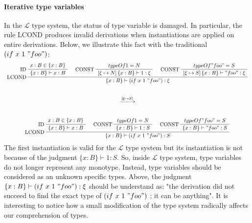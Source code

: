 \documentclass[a4paper]{report}
\newcommand{\lang}[0]{\mathcal{L}}
\newcommand{\ax}[1]%
{\AxiomC{$#1$}}
\newcommand{\unc}[1]%
{\UnaryInfC{$#1$}}
\newcommand{\tric}[1]%
{\TrinaryInfC{$#1$}}
\newcommand{\drule}%
{\DisplayProof}
\begin{document}
\paragraph{Iterative type variables} In the $\lang$ type system, the status of type variable is damaged. In particular, the rule LCOND produces invalid derivations when instantiations are applied on entire derivations. Below, we illustrate this fact with the traditional $(if\ x\ 1\ "foo")$:
$$\begin{array}{c}
\ax{x:B\in\{x:B\}}
\LeftLabel{ID}
\unc{\{x:B\}\vdash x:B}
\ax{typeOf{1}=N}
\LeftLabel{CONST}
\unc{\left[\xi\mapsto N\right]\{x:B\}\vdash 1:\xi}
\ax{typeOf{"foo"}=S}
\LeftLabel{CONST}
\unc{\left[\xi\mapsto S\right]\{x:B\}\vdash "foo":\xi}
\LeftLabel{LCOND}
\tric{\{x:B\}\vdash (if\ x\ 1\ "foo"):\xi}
\drule
\\\\\\
\xlongrightarrow{[\xi\mapsto S]}
\\\\\\
\ax{x:B\in\{x:B\}}
\LeftLabel{ID}
\unc{\{x:B\}\vdash x:B}
\ax{typeOf{1}=N}
\LeftLabel{CONST}
\unc{\{x:B\}\vdash 1:S}
\ax{typeOf{"foo"}=S}
\LeftLabel{CONST}
\unc{\{x:B\}\vdash "foo":S}
\LeftLabel{LCOND}
\tric{\{x:B\}\vdash (if\ x\ 1\ "foo"):S}
\drule
\end{array}$$
The first instantiation is valid for the $\lang$ type system but its instantiation is not because of the judgment $\{x:B\}\vdash 1:S$. So, inside $\lang$ type system, type variables do not longer represent any monotype. Instead, type variables should be considered as an unknown specific types. Above, the judgment $\{x:B\}\vdash (if\ x\ 1\ "foo"):\xi$ should be understand as: "the derivation did not succeed to find the exact type of $(if\ x\ 1\ "foo")$ ; it can be anything". It is interesting to notice how a small modification of the type system radically affects our comprehension of types.
\end{document}
